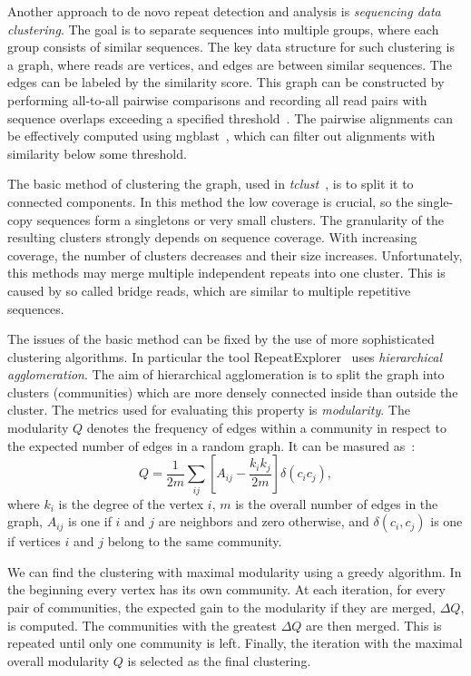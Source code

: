 Another approach to de novo repeat detection and analysis is \emph{sequencing data clustering}. The goal is to separate sequences into multiple groups, where each group consists of similar sequences.
The key data structure for such clustering is a graph, where reads are vertices, and edges are between similar sequences. The edges can be labeled by the similarity score. This graph can be constructed by performing all-to-all pairwise comparisons and recording all read pairs with sequence overlaps exceeding a specified threshold~\cite{pertea2003tigr, novak2010graph}. The pairwise alignments can be effectively computed using mgblast~\cite{pertea2003tigr}, which can filter out alignments with similarity below some threshold.

The basic method of clustering the graph, used in \emph{tclust}~\cite{pertea2003tigr}, is to split it to connected components.
In this method the low coverage is crucial, so the single-copy sequences form a singletons or very small clusters.
The granularity of the resulting clusters strongly depends on sequence coverage.
With increasing coverage, the number of clusters decreases and their size increases.
Unfortunately, this methods may merge multiple independent repeats into one cluster. This is caused by so called bridge reads, which are similar to multiple repetitive sequences.

The issues of the basic method can be fixed by the use of more sophisticated clustering algorithms. In particular the tool RepeatExplorer~\cite{novak2010graph} uses \emph{hierarchical agglomeration}. The aim of hierarchical agglomeration is to split the graph into clusters (communities) which are more densely connected inside than outside the cluster. The metrics used for evaluating this property is \emph{modularity}.
The modularity $Q$ denotes the frequency of edges within a community in respect to the expected number of edges in a random graph. It can be masured as~\cite{novak2010graph}:
$$Q = \frac{1}{2m}\sum_{ij}\left[A_{ij}-\frac{k_i k_j}{2m}\right] \delta(c_i c_j),$$
where $k_i$ is the degree of the vertex $i$, $m$ is the overall number of edges in the graph, $A_{ij}$ is one if $i$ and $j$ are neighbors and zero otherwise, and $\delta(c_i, c_j)$ is one if vertices $i$ and $j$ belong to the same community.

We can find the clustering with maximal modularity using a greedy algorithm. In the beginning every vertex has its own community.
At each iteration, for every pair of communities, the expected gain to the modularity if they are merged, $\Delta Q$, is computed. The communities with the greatest $\Delta Q$ are then merged. This is repeated until only one community is left. Finally, the iteration with the maximal overall modularity $Q$ is selected as the final clustering.

